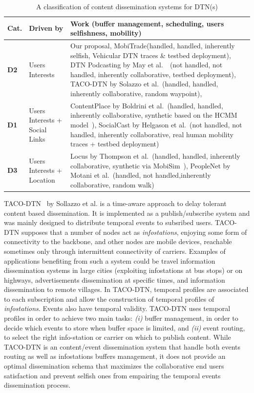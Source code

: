 \begin{table}[!h]
\renewcommand{\arraystretch}{1.1}
\caption{A classification of content dissemination systems for DTN(s)}
\centering
\footnotesize
\begin{tabular}{|p{1cm}|p{2cm}|p{9.5cm}|}
\hline
\bfseries Cat. &\bfseries Driven by&\bfseries Work (buffer management, scheduling, users selfishness, mobility)\\
\hline
\bfseries D2&Users Interests & Our proposal, MobiTrade(handled, handled, inherently selfish, Vehicular DTN traces \& testbed deployment), DTN Podcasting by May et al.~\cite{May07wirelessopportunistic}~\cite{Lenders:Podcast}(not handled, not handled, inherently collaborative, testbed deployment), TACO-DTN by Solazzo et al.~\cite{TACODTN}(handled, handled, inherently collaborative, random waypoint), \\
\hline
\bfseries D1&Users Interests + Social Links &ContentPlace by Boldrini et al.~\cite{Chiara:MSWIM08}(handled, handled, inherently collaborative, synthetic based on the HCMM model~\cite{HCMM}), SocialCast by Helgason et al.~\cite{SocialCast2, SocialCast}(not handled, not handled, inherently collaborative, real human mobility traces + testbed deployment)\\
\hline
\bfseries D3&Users Interests + Location & Locus by Thompson et al.~\cite{LOCUS}(handled, handled, inherently collaborative, synthetic via MobiSim~\cite{MobiSim}), PeopleNet by Motani et al.~\cite{Peoplenet}(handled, not handled,inherently collaborative, random walk)\\
\hline
\end{tabular}
\label{DisseminationSummary}
\end{table}

TACO-DTN~\cite{TACODTN} by Sollazzo et al. is a time-aware approach to delay tolerant content based dissemination. It is implemented as a publish/subscribe system and was mainly designed to distribute temporal events to subsribed users. TACO-DTN supposes that a number of nodes act as \emph{infostations}, enjoying some form of connectivity to the backbone, and other nodes are mobile devices, reachable sometimes only through intermittent connectivity of carriers. Examples of applications benefiting from such a system could be travel information dissemination systems in  large cities (exploiting infostations at bus stops) or on highways, advertisements dissemination at specific times, and information dissemination to remote villages. In TACO-DTN, temporal profiles are associated to each subscription and allow the construction of temporal profiles of \emph{infostations}. Events also have temporal validity. TACO-DTN uses temporal profiles in order to achieve two main tasks: \emph{(i)} buffer management, in order to decide which events to store when buffer space is limited, and \emph{(ii)} event routing, to select the right info-station or carrier on which to publish content. While TACO-DTN is an content/event dissemination system that handle both events routing as well as infostations buffers management, it does not provide an optimal dissemination schema that maximizes the collaborative end users satisfaction and prevent selfish ones from empairing the temporal events dissemination process.

